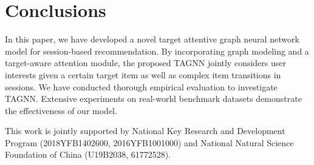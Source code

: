 \documentclass[sigconf]{acmart}
\begin{document}
 \section{Conclusions}

In this paper, we have developed a novel target attentive graph neural network model for session-based recommendation. By incorporating graph modeling and a target-aware attention module, the proposed TAGNN jointly considers user interests given a certain target item as well as complex item transitions in sessions. We have conducted thorough empirical evaluation to investigate TAGNN. Extensive experiments on real-world benchmark datasets demonstrate the effectiveness of our model.
 
\begin{acks}
This work is jointly supported by National Key Research and Development Program (2018YFB1402600, 2016YFB1001000) and National Natural Science Foundation of China (U19B2038, 61772528).
\end{acks}



\end{document}
